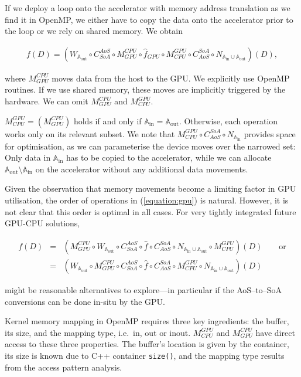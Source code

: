 If we deploy a loop onto the accelerator with memory address translation as we find it in OpenMP, we either have to copy the data onto the accelerator prior to the loop or we rely on shared memory.
We obtain

\begin{eqnarray}
  f(D) = \left( W_{\mathbb{A}_{\text{out}}} \circ C_{SoA}^{AoS} \circ M_{GPU}^{CPU} \circ \hat f_{GPU} \circ M_{CPU}^{GPU} \circ C_{AoS}^{SoA} \circ N_{\mathbb{A}_{\text{in}} \cup \mathbb{A}_{\text{out}}} \right) (D),
  \label{equation:gpu}
\end{eqnarray}

\noindent
where $M_{GPU}^{CPU}$ moves data from the host to the GPU.
We explicitly use OpenMP routines.
If we use shared memory, these moves are implicitly triggered by the hardware.
We can omit $M_{GPU}^{CPU}$ and $M_{CPU}^{GPU}$.


$M_{CPU}^{GPU} = \left( M_{GPU}^{CPU} \right)$ holds if and only if $\mathbb{A}_{\text{in}} = \mathbb{A}_{\text{out}}$.
Otherwise, each operation works only on its relevant subset.
We note that $M_{CPU}^{GPU} \circ C_{AoS}^{SoA} \circ N_{\mathbb{A}_{\text{in}}}$ provides space for optimisation, as we can parameterise the device moves over the narrowed set:
Only data in $\mathbb{A}_{\text{in}}$ has to be copied to the accelerator, while we can allocate $\mathbb{A}_{\text{out}} \setminus \mathbb{A}_{\text{in}}$ on the accelerator without any additional data movements.


Given the observation that memory movements become a limiting factor in GPU utilisation, the order of operations in (\ref{equation:gpu}) is natural.
However, it is not clear that this order is optimal in all cases.
For very tightly integrated future GPU-CPU solutions,


\begin{eqnarray*}
  f(D) & = & \left( M_{GPU}^{CPU} \circ W_{\mathbb{A}_{\text{out}}} \circ C_{SoA}^{AoS} \circ \hat f  \circ C_{AoS}^{SoA} \circ N_{\mathbb{A}_{\text{in}} \cup \mathbb{A}_{\text{out}}} \circ M_{CPU}^{GPU} \right) (D)
  \qquad \text{or}
  \\
       & = & \left( W_{\mathbb{A}_{\text{out}}} \circ M_{GPU}^{CPU} \circ C_{SoA}^{AoS} \circ \hat f  \circ C_{AoS}^{SoA} \circ M_{CPU}^{GPU} \circ N_{\mathbb{A}_{\text{in}} \cup \mathbb{A}_{\text{out}}} \right) (D)
\end{eqnarray*}

\noindent
might be reasonable alternatives to explore---in particular if the AoS--to--SoA conversions can be done in-situ by the GPU.


Kernel memory mapping in OpenMP requires three key ingredients: the buffer, its size, and the mapping type, i.e.~in, out or inout. 
$M_{CPU}^{GPU}$ and $M_{GPU}^{CPU}$ have direct access to these three properties.
The buffer's location is given by the container, 
its size is known due to C++ container \texttt{size()}, 
and the mapping type results from the access pattern analysis. 
